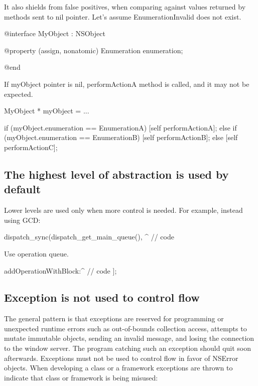 \documentclass[10pt]{extarticle}
\newenvironment{codelisting}
{\footnotesize\mdframed[middlelinewidth=0.5pt, middlelinecolor=BaliHaiColor, skipabove=15pt]\verbatim}
{\endverbatim\endmdframed\vspace{12pt}\normalsize}
\begin{document}
It also shields from false positives, when comparing against values returned by methods sent to nil pointer. Let's assume EnumerationInvalid does not exist.

\begin{codelisting}
@interface MyObject : NSObject

@property (assign, nonatomic) Enumeration enumeration;

@end
\end{codelisting}

If myObject pointer is nil, performActionA method is called, and it may not be expected.

\begin{codelisting}
MyObject * myObject = ...

if (myObject.enumeration == EnumerationA)
    [self performActionA];
else if (myObject.enumeration == EnumerationB)
    [self performActionB];
else
    [self performActionC];
\end{codelisting}


\subsection{The highest level of abstraction is used by default}

Lower levels are used only when more control is needed. For example, instead using GCD:

\begin{codelisting}
dispatch_sync(dispatch_get_main_queue(), ^{
    // code
}
\end{codelisting}

Use operation queue.

\begin{codelisting}
[[NSOperationQueue mainQueue] addOperationWithBlock:^{
    // code
}];
\end{codelisting}


\subsection{Exception is not used to control flow}

The general pattern is that exceptions are reserved for programming or unexpected runtime errors such as out-of-bounds collection access, attempts to mutate immutable objects, sending an invalid message, and losing the connection to the window server. The program catching such an exception should quit soon afterwards. Exceptions must not be used to control flow in favor of NSError objects.
When developing a class or a framework exceptions are thrown to indicate that class or framework is being misused:
\end{document}
